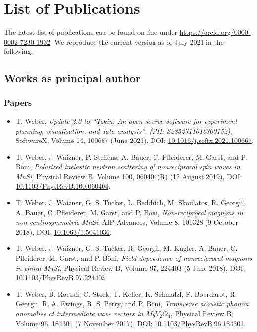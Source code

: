 \chapter{List of Publications}
The latest list of publications can be found on-line under \url{https://orcid.org/0000-0002-7230-1932}. 
We reproduce the current version as of July 2021 in the following.


\section{Works as principal author}
\subsection*{Papers}
\begin{itemize}
	\item T. Weber, \textit{Update 2.0 to ``Takin: An open-source software for experiment planning, visualisation, and data analysis'', (PII: S2352711016300152)},
	SoftwareX, Volume 14, 100667 (June 2021),
	DOI: \href{https://doi.org/10.1016/j.softx.2021.100667}{10.1016/j.softx.2021.100667}.

	\item T. Weber, J. Waizner, P. Steffens, A. Bauer, C. Pfleiderer, M. Garst, and P. B\"oni, 
	\textit{Polarized inelastic neutron scattering of nonreciprocal spin waves in MnSi},
	Physical Review B, Volume 100, 060404(R) (12 August 2019),
	DOI: \href{https://doi.org/10.1103/PhysRevB.100.060404}{10.1103/PhysRevB.100.060404}.

	\item  T. Weber, J. Waizner, G. S. Tucker, L. Beddrich, M. Skoulatos, R. Georgii, A. Bauer, C. Pfleiderer, M. Garst, and P. B\"oni, 
	\textit{Non-reciprocal magnons in non-centrosymmetric MnSi},
	AIP Advances, Volume 8, 101328 (9 October 2018),
	DOI: \href{https://doi.org/10.1063/1.5041036}{10.1063/1.5041036}.

	\item T. Weber, J. Waizner, G. S. Tucker, R. Georgii, M. Kugler, A. Bauer, C. Pfleiderer, M. Garst, and P. B\"oni, 
	\textit{Field dependence of nonreciprocal magnons in chiral MnSi},
	Physical Review B, Volume 97, 224403 (5 June 2018),
	DOI: \href{https://doi.org/10.1103/PhysRevB.97.224403}{10.1103/PhysRevB.97.224403}.

	\item T. Weber, B. Roessli, C. Stock, T. Keller, K. Schmalzl, F. Bourdarot, R. Georgii, R. A. Ewings, R. S. Perry, and P. B\"oni, 
	\textit{Transverse acoustic phonon anomalies at intermediate wave vectors in $MgV_2O_4$},
	Physical Review B, Volume 96, 184301 (7 November 2017),
	DOI: \href{https://doi.org/10.1103/PhysRevB.96.184301}{10.1103/PhysRevB.96.184301}.
	

\end{itemize}
